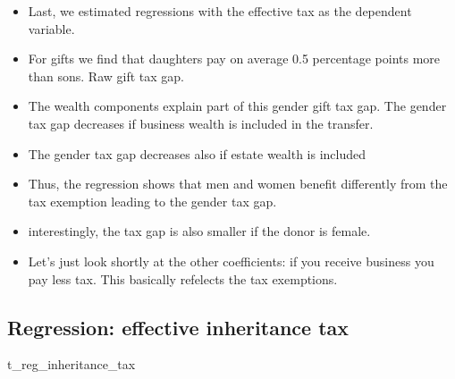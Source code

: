 \documentclass[
  letterpaper,
  DIV=11,
  numbers=noendperiod]{scrartcl}
\newenvironment{Shaded}{\begin{snugshade}}{\end{snugshade}}
\newcommand{\NormalTok}[1]{\textcolor[rgb]{0.00,0.23,0.31}{#1}}
\begin{document}
\begin{itemize}
\item
  Last, we estimated regressions with the effective tax as the dependent
  variable.
\item
  For gifts we find that daughters pay on average 0.5 percentage points
  more than sons. Raw gift tax gap.
\item
  The wealth components explain part of this gender gift tax gap. The
  gender tax gap decreases if business wealth is included in the
  transfer.
\item
  The gender tax gap decreases also if estate wealth is included
\item
  Thus, the regression shows that men and women benefit differently from
  the tax exemption leading to the gender tax gap.
\item
  interestingly, the tax gap is also smaller if the donor is female.
\item
  Let's just look shortly at the other coefficients: if you receive
  business you pay less tax. This basically refelects the tax
  exemptions.
\end{itemize}

\hypertarget{regression-effective-inheritance-tax}{%
\subsection{Regression: effective inheritance
tax}\label{regression-effective-inheritance-tax}}

\begin{Shaded}
\begin{Highlighting}[]
\NormalTok{t\_reg\_inheritance\_tax}
\end{Highlighting}
\end{Shaded}
\end{document}
